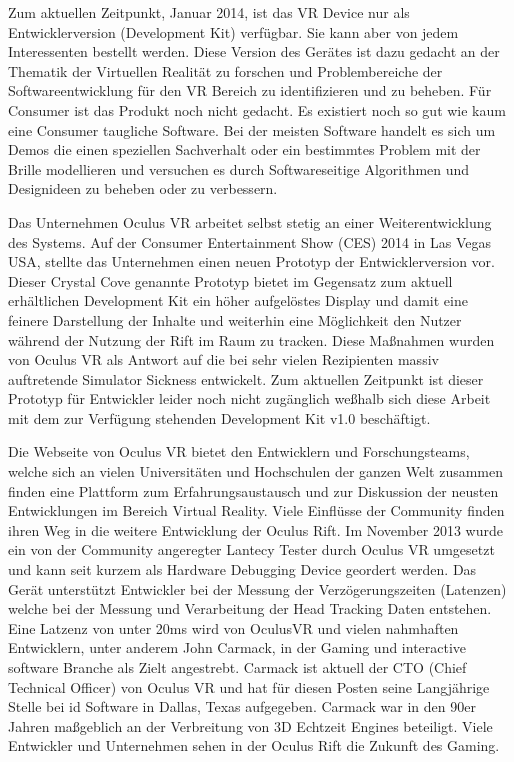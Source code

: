 \documentclass[pagesize, paper=a4, fontsize=12pt,titlepage=true, headings=small, headnosepline, abstractoff, liststotoc, nochapterprefix, plainheadsepline]{scrreprt}
\begin{document}
Zum aktuellen Zeitpunkt, Januar 2014, ist das VR Device nur als Entwicklerversion (Development Kit) verfügbar. Sie kann aber von jedem Interessenten bestellt werden. Diese Version des Gerätes ist dazu gedacht an der Thematik der Virtuellen Realität zu forschen und Problembereiche der Softwareentwicklung für den VR Bereich zu identifizieren und zu beheben. Für Consumer ist das Produkt noch nicht gedacht. Es existiert noch so gut wie kaum eine Consumer taugliche Software. Bei der meisten Software handelt es sich um Demos die einen speziellen Sachverhalt oder ein bestimmtes Problem mit der Brille modellieren und versuchen es durch Softwareseitige Algorithmen und Designideen zu beheben oder zu verbessern.

Das Unternehmen Oculus VR arbeitet selbst stetig an einer Weiterentwicklung des Systems. Auf der Consumer Entertainment Show (CES) 2014 in Las Vegas USA, stellte das Unternehmen einen neuen Prototyp der Entwicklerversion vor. Dieser Crystal Cove genannte Prototyp bietet im Gegensatz zum aktuell erhältlichen Development Kit ein höher aufgelöstes Display und damit eine feinere Darstellung der Inhalte und weiterhin eine Möglichkeit den Nutzer während der Nutzung der Rift im Raum zu tracken. Diese Maßnahmen wurden von Oculus VR als Antwort auf die bei sehr vielen Rezipienten massiv auftretende Simulator Sickness entwickelt. Zum aktuellen Zeitpunkt ist dieser Prototyp für Entwickler leider noch nicht zugänglich weßhalb sich diese Arbeit mit dem zur Verfügung stehenden Development Kit v1.0 beschäftigt.

Die Webseite von Oculus VR bietet den Entwicklern und Forschungsteams, welche sich an vielen Universitäten und Hochschulen der ganzen Welt zusammen finden eine Plattform zum Erfahrungsaustausch und zur Diskussion der neusten Entwicklungen im Bereich Virtual Reality. Viele Einflüsse der Community finden ihren Weg in die weitere Entwicklung der Oculus Rift. Im November 2013 wurde ein von der Community angeregter Lantecy Tester durch Oculus VR umgesetzt und kann seit kurzem als Hardware Debugging Device geordert werden. Das Gerät unterstützt Entwickler bei der Messung der Verzögerungszeiten (Latenzen) welche bei der Messung und Verarbeitung der Head Tracking Daten entstehen. Eine Latzenz von unter 20ms wird von OculusVR und vielen nahmhaften Entwicklern, unter anderem John Carmack, in der Gaming und interactive software Branche als Zielt angestrebt. Carmack ist aktuell der CTO (Chief Technical Officer) von Oculus VR und hat für diesen Posten seine Langjährige Stelle bei id Software in Dallas, Texas aufgegeben. Carmack war in den 90er Jahren maßgeblich an der Verbreitung von 3D Echtzeit Engines beteiligt. Viele Entwickler und Unternehmen sehen in der Oculus Rift die Zukunft des Gaming.
\end{document}
